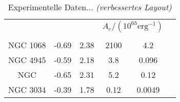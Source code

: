 \begin{table}[t]
    \centering
    \begin{tabular}{c*{5}{S}}
        \toprule
         &
        {\mr{$\delta$}} &
        {} &
         \\
        & & &
         &
         \\
        \hline
        NGC 1068 & -0.69 & 2.38 & 2100 & 4.2 \\
        NGC 4945 & -0.59 & 2.18 & 3.8 & 0.096 \\
        NGC  & -0.65 & 2.31 & 5.2 & 0.12 \\
        NGC 3034 & -0.39 & 1.78 & 0.12 & 0.0049 \\
        \bottomrule
    \end{tabular}
    \caption{Experimentelle Daten... \emph{(verbessertes Layout)}}
    \label{tab:tab4}
\end{table}
